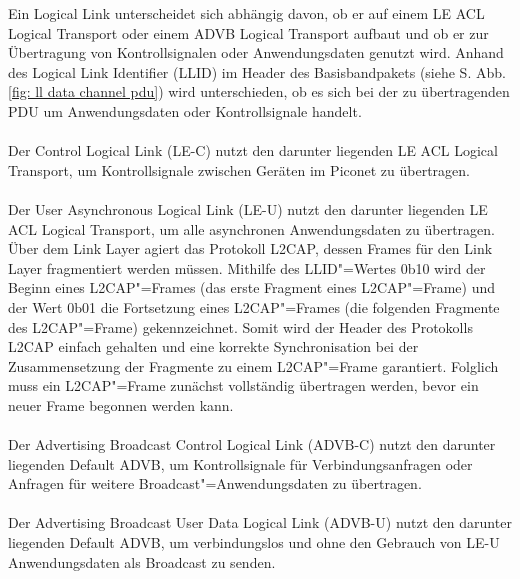 Ein Logical Link unterscheidet sich abhängig davon, ob er auf einem LE ACL Logical Transport oder einem ADVB Logical Transport aufbaut und ob er zur Übertragung von Kontrollsignalen oder Anwendungsdaten genutzt wird. Anhand des Logical Link Identifier (LLID) im Header des Basisbandpakets (siehe S. \pageref{fig: ll data channel pdu} Abb. \ref{fig: ll data channel pdu}) wird unterschieden, ob es sich bei der zu übertragenden PDU um Anwendungsdaten oder Kontrollsignale handelt.
\\\\
Der Control Logical Link (LE-C) nutzt den darunter liegenden LE ACL Logical Transport, um Kontrollsignale zwischen Geräten im Piconet zu übertragen.
\\\\
Der User Asynchronous Logical Link (LE-U) nutzt den darunter liegenden LE ACL Logical Transport, um alle asynchronen Anwendungsdaten zu übertragen. Über dem Link Layer agiert das Protokoll L2CAP, dessen Frames für den Link Layer fragmentiert werden müssen. Mithilfe des LLID"=Wertes 0b10 wird der Beginn eines L2CAP"=Frames (das erste Fragment eines L2CAP"=Frame) und der Wert 0b01 die Fortsetzung eines L2CAP"=Frames (die folgenden Fragmente des L2CAP"=Frame) gekennzeichnet. Somit wird der Header des Protokolls L2CAP einfach gehalten und eine korrekte Synchronisation bei der Zusammensetzung der Fragmente zu einem L2CAP"=Frame garantiert. Folglich muss ein L2CAP"=Frame zunächst vollständig übertragen werden, bevor ein neuer Frame begonnen werden kann. \cite{BtSpec4.0_176-177}
\\\\
Der Advertising Broadcast Control Logical Link (ADVB-C) nutzt den darunter liegenden Default ADVB, um Kontrollsignale für Verbindungsanfragen oder Anfragen für weitere Broadcast"=Anwendungsdaten zu übertragen.
\\\\
Der Advertising Broadcast User Data Logical Link (ADVB-U) nutzt den darunter liegenden Default ADVB, um verbindungslos und ohne den Gebrauch von LE-U Anwendungsdaten als Broadcast zu senden. \cite{BtSpec4.0_176-177}
